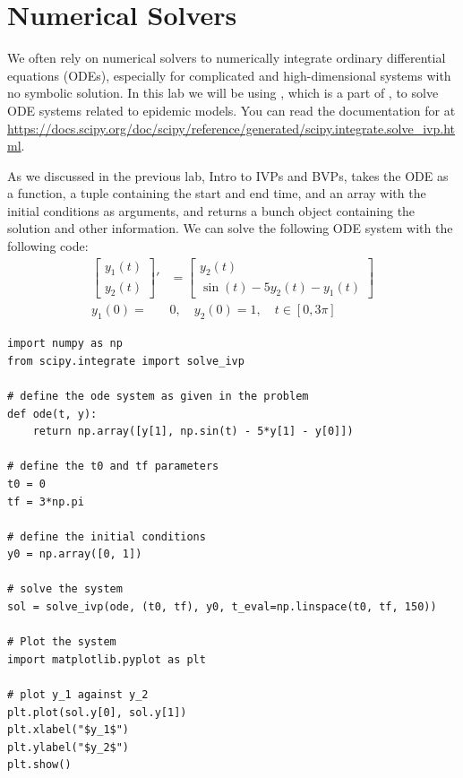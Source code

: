 \label{lab:SIRModels}

\section*{Numerical Solvers}
We often rely on numerical solvers to numerically integrate ordinary differential equations (ODEs), especially for complicated and high-dimensional systems with no symbolic solution.
In this lab we will be using , which is a part of , to solve ODE systems related to epidemic models.
You can read the documentation for  at \url{https://docs.scipy.org/doc/scipy/reference/generated/scipy.integrate.solve_ivp.html}.

As we discussed in the previous lab, Intro to IVPs and BVPs,  takes the ODE as a function, a tuple containing the start and end time, and an array with the initial conditions as arguments, and returns a bunch object containing the solution and other information.
We can solve the following ODE system with the following code:
\begin{equation}\label{ex:ivp-example}
    \begin{aligned}
    \begin{bmatrix} y_1(t) \\ y_2(t)\end{bmatrix}'
    &= \begin{bmatrix} y_2(t) \\ \sin(t) - 5y_2(t) - y_1(t) \end{bmatrix} \\
    y_1(0) = &0, \quad y_2(0)=1, \quad t\in[0,3\pi]
    \end{aligned}
\end{equation}
\begin{lstlisting}
import numpy as np
from scipy.integrate import solve_ivp

# define the ode system as given in the problem
def ode(t, y):
    return np.array([y[1], np.sin(t) - 5*y[1] - y[0]])

# define the t0 and tf parameters
t0 = 0
tf = 3*np.pi

# define the initial conditions
y0 = np.array([0, 1])

# solve the system
sol = solve_ivp(ode, (t0, tf), y0, t_eval=np.linspace(t0, tf, 150))

# Plot the system
import matplotlib.pyplot as plt

# plot y_1 against y_2
plt.plot(sol.y[0], sol.y[1])
plt.xlabel("$y_1$")
plt.ylabel("$y_2$")
plt.show()
\end{lstlisting}

